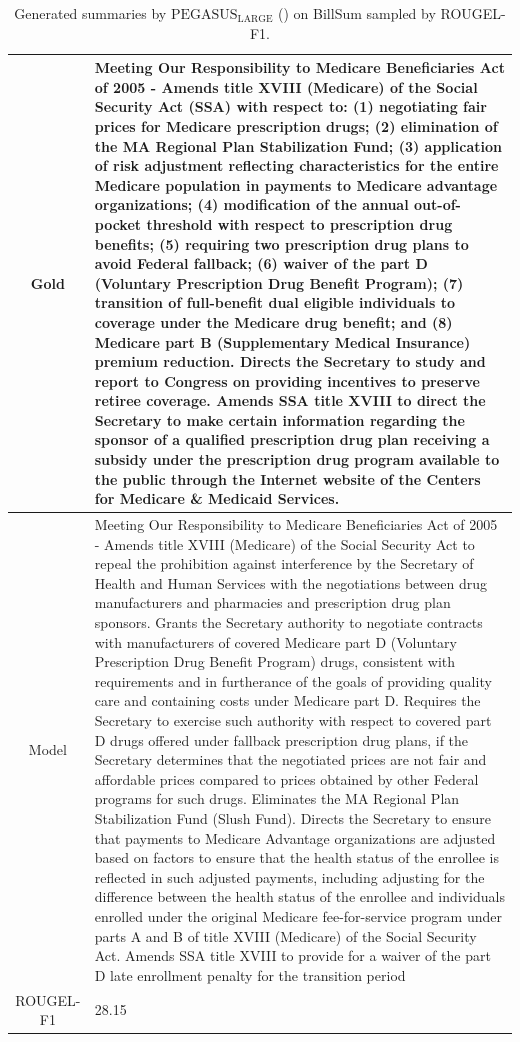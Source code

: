 \begin{table}[bth!]
\begin{tabular}{c|p{}}
\\ \hline
Gold & 
Meeting Our Responsibility to Medicare Beneficiaries Act of 2005 - Amends title XVIII (Medicare) of the Social Security Act (SSA) with respect to: (1) negotiating fair prices for Medicare prescription drugs; (2) elimination of the MA Regional Plan Stabilization Fund; (3) application of risk adjustment reflecting characteristics for the entire Medicare population in payments to Medicare advantage organizations; (4) modification of the annual out-of-pocket threshold with respect to prescription drug benefits; (5) requiring two prescription drug plans to avoid Federal fallback; (6) waiver of the part D (Voluntary Prescription Drug Benefit Program); (7) transition of full-benefit dual eligible individuals to coverage under the Medicare drug benefit; and (8) Medicare part B (Supplementary Medical Insurance) premium reduction. Directs the Secretary to study and report to Congress on providing incentives to preserve retiree coverage. Amends SSA title XVIII to direct the Secretary to make certain information regarding the sponsor of a qualified prescription drug plan receiving a subsidy under the prescription drug program available to the public through the Internet website of the Centers for Medicare \& Medicaid Services.
\\ \hline
Model & 
Meeting Our Responsibility to Medicare Beneficiaries Act of 2005 - Amends title XVIII (Medicare) of the Social Security Act to repeal the prohibition against interference by the Secretary of Health and Human Services with the negotiations between drug manufacturers and pharmacies and prescription drug plan sponsors. Grants the Secretary authority to negotiate contracts with manufacturers of covered Medicare part D (Voluntary Prescription Drug Benefit Program) drugs, consistent with requirements and in furtherance of the goals of providing quality care and containing costs under Medicare part D. Requires the Secretary to exercise such authority with respect to covered part D drugs offered under fallback prescription drug plans, if the Secretary determines that the negotiated prices are not fair and affordable prices compared to prices obtained by other Federal programs for such drugs. Eliminates the MA Regional Plan Stabilization Fund (Slush Fund). Directs the Secretary to ensure that payments to Medicare Advantage organizations are adjusted based on factors to ensure that the health status of the enrollee is reflected in such adjusted payments, including adjusting for the difference between the health status of the enrollee and individuals enrolled under the original Medicare fee-for-service program under parts A and B of title XVIII (Medicare) of the Social Security Act. Amends SSA title XVIII to provide for a waiver of the part D late enrollment penalty for the transition period
\\ \hline
ROUGEL-F1 & 
28.15
\\ \hline
\end{tabular}
\caption{Generated summaries by $\text{PEGASUS}_{\text{LARGE}}$ (\gnews) on BillSum sampled by ROUGEL-F1.}
\end{table}
